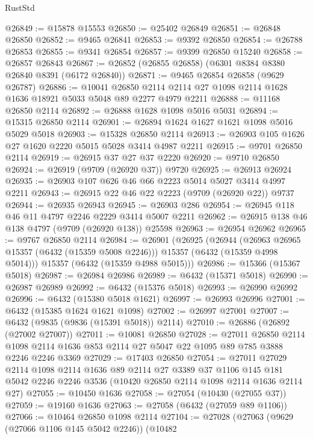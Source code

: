 \begin{lexlean}{RustStd}
\begin{coremodule}
@26849 := @15878 @15553
@26850 := @25402 @26849
@26851 := @26848 @26850
@26852 := @9465 @26841
@26853 := @9392 @26850
@26854 := @26788 @26853
@26855 := @9341 @26854
@26857 := @9399 @26850 @15240
@26858 := @26857 @26843
@26867 := @26852 (@26855 @26858) (@6301 @8384 @8380 @26840 @8391 (@6172 @26840))
@26871 := @9465 @26854 @26858 (@9629 @26787)
@26886 := @10041
    @26850
    @2114
    @2114
    @27
    @1098
    @2114
    @1628
    @1636
    @18921
    @5033
    @5048
    @89
    @2277
    @4979
    @2211
@26888 := @11168 @26850 @2114
@26892 := @26888 @1628 @1098 @5016 @5031
@26894 := @15315 @26850 @2114
@26901 := @26894 @1624 @1627 @1621 @1098 @5016 @5029 @5018
@26903 := @15328 @26850 @2114
@26913 := @26903 @105 @1626 @27 @1620 @2220 @5015 @5028 @3414 @4987 @2211
@26915 := @9701 @26850 @2114
@26919 := @26915 @37 @27 @37 @2220
@26920 := @9710 @26850
@26924 := @26919 (@9709 (@26920 @37)) @9720
@26925 := @26913 @26924
@26935 := @26903 @107 @626 @46 @66 @2223 @5014 @5027 @3414 @4997 @2211
@26943 := @26915 @22 @46 @22 @2223 (@9709 (@26920 @22)) @9737
@26944 := @26935 @26943
@26945 := @26903 @286
@26954 := @26945 @118 @46 @11 @4797 @2246 @2229 @3414 @5007 @2211
@26962 := @26915 @138 @46 @138 @4797 (@9709 (@26920 @138)) @25598
@26963 := @26954 @26962
@26965 := @9767 @26850 @2114
@26984 := @26901
    (@26925
      (@26944
        (@26963 @26965 @15357 (@6432 (@15359 @5008 @2246)))
        @15357
        (@6432 (@15359 @4998 @5014)))
      @15357
      (@6432 (@15359 @4988 @5015)))
@26986 := @15366 (@15367 @5018)
@26987 := @26984 @26986
@26989 := @6432 (@15371 @5018)
@26990 := @26987 @26989
@26992 := @6432 (@15376 @5018)
@26993 := @26990 @26992
@26996 := @6432 (@15380 @5018 @1621)
@26997 := @26993 @26996
@27001 := @6432 (@15385 @1624 @1621 @1098)
@27002 := @26997 @27001
@27007 := @6432 (@9835 (@9836 (@15391 @5018)) @2114)
@27010 := @26886 (@26892 (@27002 @27007))
@27011 := @10081 @26850
@27028 := @27011
    @26850
    @2114
    @1098
    @2114
    @1636
    @853
    @2114
    @27
    @5047
    @22
    @1095
    @89
    @785
    @3888
    @2246
    @2246
    @3369
@27029 := @17403 @26850
@27054 := @27011
    @27029
    @2114
    @1098
    @2114
    @1636
    @89
    @2114
    @27
    @3389
    @37
    @1106
    @145
    @181
    @5042
    @2246
    @2246
    @3536
    (@10420 @26850 @2114 @1098 @2114 @1636 @2114 @27)
@27055 := @10450 @1636
@27058 := @27054 (@10430 (@27055 @37))
@27059 := @19160 @1636
@27063 := @27058 (@6432 (@27059 @89 @1106))
@27066 := @10464 @26850 @1098 @2114
@27104 := @27028
    (@27063
      (@9629 (@27066 @1106 @145 @5042 @2246))
      (@10482

\end{coremodule}
\end{lexlean}
